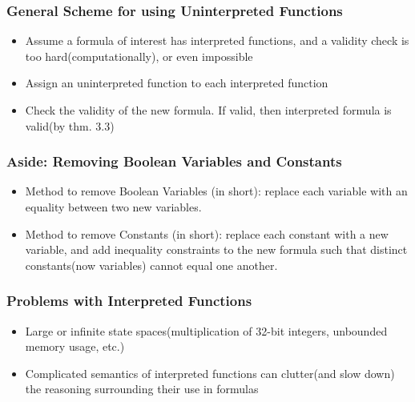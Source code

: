 \documentclass{beamer}
\begin{document}
\begin{frame}

 \frametitle{General Scheme for using Uninterpreted Functions}
 
 \begin{itemize}
 \item Assume a formula of interest has interpreted functions, and a validity check is too hard(computationally), or even impossible

 \item Assign an uninterpreted function to each interpreted function
 \item Check the validity of the new formula.  If valid, then interpreted formula is valid(by thm. 3.3)

 \end{itemize}
 
\end{frame}

\begin{frame}

 \frametitle{Aside:  Removing Boolean Variables and Constants}
 
 \begin{itemize}
 
 \item Method to remove Boolean Variables (in short):  replace each variable with an equality between two new variables.
 \item Method to remove Constants (in short):  replace each constant with a new variable, and add inequality constraints to the new formula such that distinct constants(now variables) cannot equal one another.
 
 \end{itemize}
 
\end{frame}

\begin{frame}

 \frametitle{Problems with Interpreted Functions }
 
 \begin{itemize}
 
 \item Large or infinite state spaces(multiplication of 32-bit integers, unbounded memory usage, etc.)
 \item Complicated semantics of interpreted functions can clutter(and slow down) the reasoning surrounding their use in formulas
 
 \end{itemize}
 
\end{frame}
\end{document}
